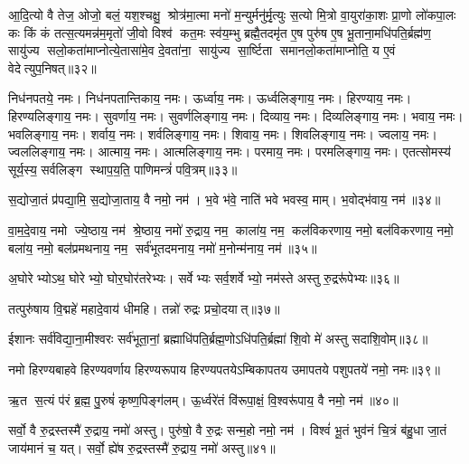 आ॒दि॒त्यो वै तेज॒ ओजो॒ बलं॒ यश॒श्चक्षु॒ श्रोत्र॑मा॒त्मा मनो॑ म॒न्युर्मनु॑र्मृ॒त्युः स॒त्यो मि॒त्रो वा॒युरा॑का॒शः प्रा॒णो लो॑कपा॒लः कः किं कं तत्स॒त्यमन्न॑म॒मृतो॑ जी॒वो विश्व॑ कत॒मः स्व॑य॒म्भु ब्रह्मै॒तदमृ॑त ए॒ष पुरु॑ष ए॒ष भू॒ताना॒मधि॑पति॒र्ब्रह्म॑ण॒ सायु॑ज्य सलो॒कता॑माप्नोत्ये॒तासा॑मे॒व दे॒वता॑ना॒ सायु॑ज्य सा॒र्ष्टिता समानलो॒कता॑माप्नोति॒ य ए॒वं वेदेत्युप॒निषत्॥३२॥
\anuvakamend

निध॑नपतये॒ नमः। 
निध॑नपतान्तिकाय॒ नमः। 
ऊर्ध्वाय॒ नमः। 
ऊर्ध्वलिङ्गाय॒ नमः। 
हिरण्याय॒ नमः। 
हिरण्यलिङ्गाय॒ नमः। 
सुवर्णाय॒ नमः। 
सुवर्णलिङ्गाय॒ नमः। 
दिव्याय॒ नमः। 
दिव्यलिङ्गाय॒ नमः। 
भवाय॒ नमः। 
भवलिङ्गाय॒ नमः। 
शर्वाय॒ नमः। 
शर्वलिङ्गाय॒ नमः। 
शिवाय॒ नमः। 
शिवलिङ्गाय॒ नमः। 
ज्वलाय॒ नमः। 
ज्वललिङ्गाय॒ नमः। 
आत्माय॒ नमः। 
आत्मलिङ्गाय॒ नमः। 
परमाय॒ नमः। 
परमलिङ्गाय॒ नमः। 
एतत्सोमस्य॑ सूर्य॒स्य॒ सर्वलिङ्ग स्थाप॒य॒ति॒ पाणिमन्त्रं॑ पवि॒त्रम्॥३३॥
\anuvakamend

स॒द्योजा॒तं प्र॑पद्या॒मि॒ स॒द्योजा॒ताय॒ वै नमो॒ नम॑। 
भ॒वे भ॑वे॒ नाति॑ भवे भवस्व॒ माम्। 
भ॒वोद्भ॑वाय॒ नम॑॥३४॥
\anuvakamend

वा॒म॒दे॒वाय॒ नमो ज्ये॒ष्ठाय॒ नम॑ श्रे॒ष्ठाय॒ नमो॑ रु॒द्राय॒ नम॒ काला॑य॒ नम॒ कल॑विकरणाय॒ नमो॒ बल॑विकरणाय॒ नमो॒ बला॑य॒ नमो॒ बल॑प्रमथनाय॒ नम॒ सर्व॑भूतदमनाय॒ नमो॑ म॒नोन्म॑नाय॒ नम॑॥३५॥\anuvakamend

अ॒घोरेभ्योऽथ॒ घोरेभ्यो॒ घोर॒घोर॑तरेभ्यः। 
सर्वेभ्यः सर्व॒शर्वेभ्यो॒ नम॑स्ते अस्तु रु॒द्ररू॑पेभ्यः॥३६॥
\anuvakamend

तत्पुरु॑षाय वि॒द्महे॑ महादे॒वाय॑ धीमहि। 
तन्नो॑ रुद्रः प्रचो॒दयात्॥३७॥
\anuvakamend

ईशानः सर्व॑विद्या॒ना॒मीश्वरः सर्व॑भूता॒नां॒ ब्रह्माधि॑पति॒र्ब्रह्म॒णो\-ऽधि॑पति॒र्ब्रह्मा॑ शि॒वो मे॑ अस्तु सदाशि॒वोम्॥३८॥
\anuvakamend

नमो हिरण्यबाहवे हिरण्यवर्णाय हिरण्यरूपाय हिरण्यपतये\-ऽम्बिकापतय उमापतये पशुपतये॑ नमो॒ नमः॥३९॥
\anuvakamend

ऋ॒त स॒त्यं प॑रं ब्र॒ह्म॒ पु॒रुषं॑ कृष्ण॒पिङ्ग॑लम्। 
ऊ॒र्ध्वरे॑तं वि॑रूपा॒क्षं॒ वि॒श्वरू॑पाय॒ वै नमो॒ नम॑॥४०॥
\anuvakamend

सर्वो॒ वै रु॒द्रस्तस्मै॑ रु॒द्राय॒ नमो॑ अस्तु। 
पुरु॑षो॒ वै रु॒द्रः सन्म॒हो नमो॒ नम॑। 
विश्वं॑ भू॒तं भुव॑नं चि॒त्रं ब॑हु॒धा जा॒तं जाय॑मानं च॒ यत्। 
सर्वो॒ ह्ये॑ष रु॒द्रस्तस्मै॑ रु॒द्राय॒ नमो॑ अस्तु॥४१॥
\anuvakamend


